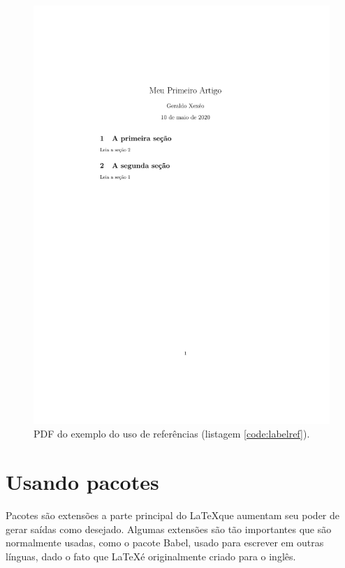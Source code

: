 

\begin{figure}
    \centering
    \includegraphics[height=.4\textheight,frame,
    clip,trim= 4.5cm  11cm 4cm 5cm]{labelref}
    \caption{PDF do exemplo do uso de referências (listagem \ref{code:labelref}).}
    \label{fig:labelref}
\end{figure}

\section{Usando pacotes}

Pacotes são extensões a parte principal do \LaTeX  que aumentam seu poder de gerar saídas como desejado. Algumas extensões são tão importantes que são normalmente usadas, como o pacote Babel\parencite{Braams:2020a}, usado para escrever em outras línguas, dado o fato que \LaTeX  é originalmente criado para o inglês.

